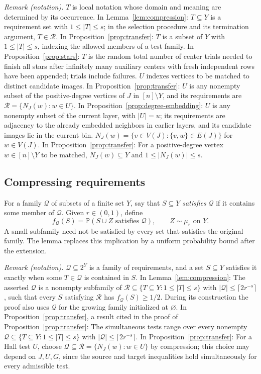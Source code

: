 \documentclass[11pt]{article}
\theoremstyle{remark}
\numberwithin{equation}{section}
\newcommand{\Prob}{\mathbb P}
\newcommand{\calQ}{\mathcal Q}
\newcommand{\calR}{\mathcal R}
\begin{document}
\noindent\textit{Remark (notation).} $T$ is local notation whose domain and meaning are determined by its occurrence. In Lemma~\ref{lem:compression}: $T\subseteq Y$ is a requirement set with $1\leq|T|\leq s$; in the selection procedure and its termination argument, $T\in\calR$. In Proposition~\ref{prop:transfer}: $T$ is a subset of $Y$ with $1\leq|T|\leq s$, indexing the allowed members of a test family. In Proposition~\ref{prop:stars}: $T$ is the random total number of center trials needed to finish all stars after infinitely many auxiliary centers with fresh independent rows have been appended; trials include failures. $U$ indexes vertices to be matched to distinct candidate images. In Proposition~\ref{prop:transfer}: $U$ is any nonempty subset of the positive-degree vertices of $J$ in $[n]\setminus Y$, and its requirements are $\calR=\{N_J(w):w\in U\}$. In Proposition~\ref{prop:degree-embedding}: $U$ is any nonempty subset of the current layer, with $|U|=u$; its requirements are adjacency to the already embedded neighbors in earlier layers, and its candidate images lie in the current bin. $N_J(w)=\{v\in V(J):\{v,w\}\in E(J)\}$ for $w\in V(J)$. In Proposition~\ref{prop:transfer}: For a positive-degree vertex $w\in[n]\setminus Y$ to be matched, $N_J(w)\subseteq Y$ and $1\leq|N_J(w)|\leq s$.


\subsection{Compressing requirements}

For a family $\calQ$ of subsets of a finite set $Y$, say that
$S\subseteq Y$ \emph{satisfies} $\calQ$ if it contains some
member of $\calQ$. Given $r\in(0,1)$, define
\begin{equation}\label{eq:smoothed-test}
 f_{\calQ}(S)=\Prob(S\cup Z\text{ satisfies }\calQ),
 \qquad Z\sim\mu_r\text{ on }Y.
\end{equation}
A small subfamily need not be satisfied by every set that
satisfies the original family. The lemma replaces this implication
by a uniform probability bound after the extension.

\noindent\textit{Remark (notation).} $\calQ\subseteq2^Y$ is a family of requirements, and a set $S\subseteq Y$ satisfies it exactly when some $T\in\calQ$ is contained in $S$. In Lemma~\ref{lem:compression}: The asserted $\calQ$ is a nonempty subfamily of $\calR\subseteq\{T\subseteq Y:1\leq|T|\leq s\}$ with $|\calQ|\leq\lceil2r^{-s}\rceil$, such that every $S$ satisfying $\calR$ has $f_{\calQ}(S)\geq1/2$. During its construction the proof also uses $\calQ$ for the growing family initialized at $\varnothing$. In Proposition~\ref{prop:transfer}, a result cited in the proof of Proposition~\ref{prop:transfer}: The simultaneous tests range over every nonempty $\calQ\subseteq\{T\subseteq Y:1\leq|T|\leq s\}$ with $|\calQ|\leq\lceil2r^{-s}\rceil$. In Proposition~\ref{prop:transfer}: For a Hall test $U$, choose $\calQ\subseteq\calR=\{N_J(w):w\in U\}$ by compression; this choice may depend on $J,U,G$, since the source and target inequalities hold simultaneously for every admissible test.
\end{document}
